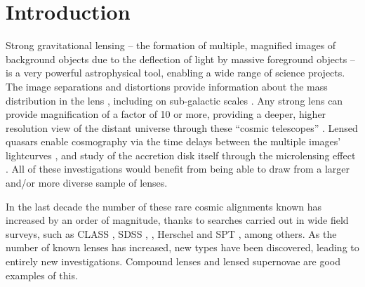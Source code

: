 \documentclass[useAMS,usenatbib,a4paper]{mn2e}
\begin{document}

\section{Introduction}
\label{sec:intro}


Strong gravitational lensing -- the formation of multiple, magnified images of
background objects due to the deflection of light by  massive foreground
objects -- is a very powerful astrophysical tool, enabling a wide range of
science projects. The image separations and distortions provide information
about the mass distribution in the lens \citep[e.g.][]{AugerEtal2010,
SonnenfeldEtal2012,MoreEtal2012,SonnenfeldEtal2015}, including on sub-galactic scales
\citep[e.g.][]{Dalal+Kochanek2002,VegettiEtal2010,HezavehEtal2013}. Any strong
lens can provide magnification of a factor of 10 or more, providing a deeper,
higher resolution view of the distant universe through these ``cosmic
telescopes'' \citep[e.g.][]{StarkEtal2008,NewtonEtal2011}. Lensed quasars
enable cosmography via the time delays between the multiple images'
lightcurves \citep[e.g.][]{TewesEtal2013,SuyuEtal2013}, and study of the
accretion disk itself through the microlensing effect
\citep[e.g.][]{PoindexterEtal2008}. All of these investigations would
benefit from being able to draw from a larger and/or more diverse sample of lenses.

In the last decade the number of these rare cosmic alignments known
has increased by an order of magnitude, thanks to searches carried out in
wide field surveys, such as
CLASS \citep[e.g.]{BrowneEtal2003}, SDSS \citep[e.g.][]
{BoltonEtal2006,AugerEtal2010b,TreuEtal2011,InadaEtal2012,
HennawiEtal2008,BelokurovEtal2009,DiehlEtal2009,FurlanettoEtal2013},
\cfhtls \citep[e.g.][]{MoreEtal2012,GavazziEtal2014}, Herschel
\citep[][]{NegrelloEtal2014} and SPT \citep[e.g.][]{VieiraEtal2013}, among
others.  As the number of known lenses has increased, new types have been
discovered, leading to entirely new investigations. Compound lenses
\citep{GavazziEtal2008,CollettEtal2012} and lensed supernovae
\citep{QuimbyEtal2014,KellyEtal2015} are good examples of this.
\end{document}
